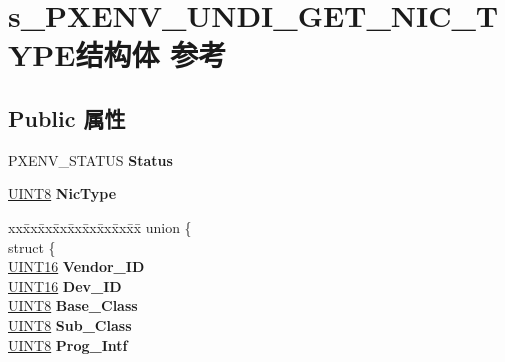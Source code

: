 \hypertarget{structs___p_x_e_n_v___u_n_d_i___g_e_t___n_i_c___t_y_p_e}{}\section{s\+\_\+\+P\+X\+E\+N\+V\+\_\+\+U\+N\+D\+I\+\_\+\+G\+E\+T\+\_\+\+N\+I\+C\+\_\+\+T\+Y\+P\+E结构体 参考}
\label{structs___p_x_e_n_v___u_n_d_i___g_e_t___n_i_c___t_y_p_e}
\subsection*{Public 属性}
\begin{DoxyCompactItemize}
\item 
\mbox{\label{structs___p_x_e_n_v___u_n_d_i___g_e_t___n_i_c___t_y_p_e_ad8888c13883172d1b548ff7afeed2606}} 
P\+X\+E\+N\+V\+\_\+\+S\+T\+A\+T\+US {\bfseries Status}
\item 
\mbox{\label{structs___p_x_e_n_v___u_n_d_i___g_e_t___n_i_c___t_y_p_e_a3ed101ac1050b0743e1f341b425dd6ac}} 
\hyperlink{_processor_bind_8h_ab27e9918b538ce9d8ca692479b375b6a}{U\+I\+N\+T8} {\bfseries Nic\+Type}
\item 
\mbox{\label{structs___p_x_e_n_v___u_n_d_i___g_e_t___n_i_c___t_y_p_e_a7f551bbc1a534c8ce10adc257bdea129}} 
\begin{tabbing}
xx\=xx\=xx\=xx\=xx\=xx\=xx\=xx\=xx\=\kill
union \{\\
\>struct \{\\
\>\>\hyperlink{_processor_bind_8h_a09f1a1fb2293e33483cc8d44aefb1eb1}{UINT16} {\bfseries Vendor\_ID}\\
\>\>\hyperlink{_processor_bind_8h_a09f1a1fb2293e33483cc8d44aefb1eb1}{UINT16} {\bfseries Dev\_ID}\\
\>\>\hyperlink{_processor_bind_8h_ab27e9918b538ce9d8ca692479b375b6a}{UINT8} {\bfseries Base\_Class}\\
\>\>\hyperlink{_processor_bind_8h_ab27e9918b538ce9d8ca692479b375b6a}{UINT8} {\bfseries Sub\_Class}\\
\>\>\hyperlink{_processor_bind_8h_ab27e9918b538ce9d8ca692479b375b6a}{UINT8} {\bfseries Prog\_Intf}\\

\end{tabbing}
\end{DoxyCompactItemize}

